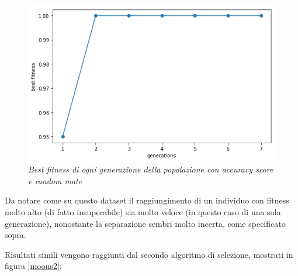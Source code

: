 \documentclass[12pt,a4paper]{report}
\begin{document}
\begin{figure}[H]
 \centering
 \includegraphics[scale = 0.4]{images/moons-rnd-acc./best}
 \caption{\textit{Best fitness di ogni generazione della popolazione con accuracy score e random mate}}
 \label{best1}
\end{figure}

Da notare come su questo dataset il raggiungimento di un individuo con fitness molto alto (di fatto insuperabile) sia molto veloce (in questo caso di una sola generazione), nonostante la separazione sembri molto incerta, come specificato sopra.

Risultati simili vengono raggiunti dal secondo algoritmo di selezione, mostrati in figura \ref{moons2}:
\end{document}
